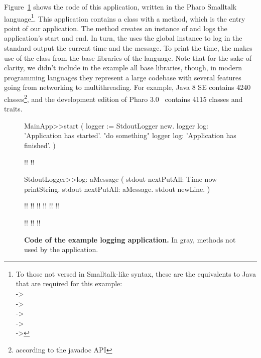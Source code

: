 Figure~\ref{fig:code_example1} shows the code of this application, written in the Pharo Smalltalk language\footnote{To those not versed in Smalltalk-like syntax, these are the equivalents to Java that are required for this example:\\
 -> \\
 -> \\
 -> \\
 -> \\
 -> 
}. This application contains a  class with a  method, which is the entry point of our application. The  method creates an instance of  and logs the application's start and end. In turn, the  uses the  global instance to log in the standard output the current time and the message. To print the time, the  makes use of the  class from the base libraries of the language. Note that for the sake of clarity, we didn't include in the example all base libraries, though, in modern programming languages they represent a large codebase with several features going from networking to multithreading. For example, Java 8 SE contains 4240 classes\footnote{according to the javadoc API}, and the development edition of Pharo 3.0~\cite{Blac09a} contains 4115 classes and traits.

\begin{figure}[ht]
\begin{code}
MainApp>>start (
    logger := StdoutLogger new.
    logger log: 'Application has started'.
    "do something"
    logger log: 'Application has finished'. )

!!
!!

StdoutLogger>>log: aMessage (
    stdout nextPutAll: Time now printString.
    stdout nextPutAll: aMessage.
    stdout newLine. )
    
!!
!!
!!
!!
!!
!!

!!
!!
!!
\end{code}

\caption{ \small\textbf{Code of the example logging application.} In gray, methods not used by the application.\label{fig:code_example1}}
\end{figure}

